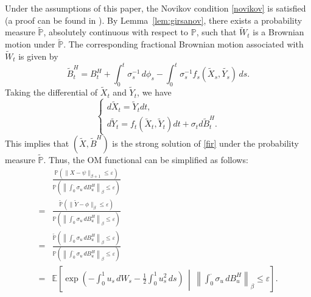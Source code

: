 \documentclass{article}
\theoremstyle{definition}  %
\theoremstyle{plain}  %
\begin{document}
Under the assumptions of this paper, the Novikov condition \eqref{novikov} is satisfied (a proof can be found in\cite{NUALART2002103} ). By Lemma~\ref{lem:girsanov}, 
there exists a probability measure $\tilde{\mathbb{P}}$, absolutely continuous with respect to $\mathbb{P}$,  
such that $\tilde{W}_t$ is a Brownian motion under $\tilde{\mathbb{P}}$.  
The corresponding fractional Brownian motion associated with $\tilde{W}_t$ is given by
\begin{equation*}
    \tilde{B}^H_t 
    = B^H_t 
    + \int_0^t \sigma_s^{-1} \, d\phi_s
    - \int_0^t \sigma_s^{-1} f_s(\tilde{X}_s,\tilde{Y_s}) \, ds.
\end{equation*}
Taking the differential of $\tilde{X}_t$ and $\tilde{Y}_t$, we have
\begin{equation*}
\begin{cases}
d\tilde{X}_t = \tilde{Y}_t dt, \\
d\tilde{Y}_t = f_t(\tilde{X}_t, \tilde{Y}_t) dt + \sigma_t d\tilde{B}^H_t.
\end{cases}
\end{equation*} 
This implies that $(\tilde{X}, \tilde{B}^H)$ is the strong solution of \eqref{fir} under the probability measure $\tilde{\mathbb{P}}$.
 Thus, the OM functional can be simplified as follows:  
\[
\begin{aligned}
&\frac{\mathbb{P}(\|X - \psi\|_{\beta+1} \leq \varepsilon)}{\mathbb{P}\left( \left\| \int_0^\cdot \sigma_u \, dB^H_u \right\|_\beta \leq \varepsilon \right)} \\
=& \frac{\tilde{\mathbb{P}}(\| \tilde{Y} - \phi \|_{\beta} \leq \varepsilon)}{\mathbb{P}\left( \left\| \int_0^\cdot \sigma_u \, dB^H_u \right\|_{\beta} \leq \varepsilon \right)} \\
=& \frac{\tilde{\mathbb{P}}\left( \left\| \int_0^\cdot \sigma_u \, dB^H_u \right\|_{\beta} \leq \varepsilon \right)}{\mathbb{P}\left( \left\| \int_0^\cdot \sigma_u \, dB^H_u \right\|_{\beta} \leq \varepsilon \right)} \\
=& \mathbb{E} \left[ \exp \left( -\int_0^1 u_s \, dW_s - \frac{1}{2} \int_0^1 u_s^2 \, ds \right) \,\middle|\, \left\| \int_0^\cdot \sigma_u \, dB^H_u \right\|_{\beta} \leq \varepsilon  \right].
\end{aligned}
\]

  
\end{document}
